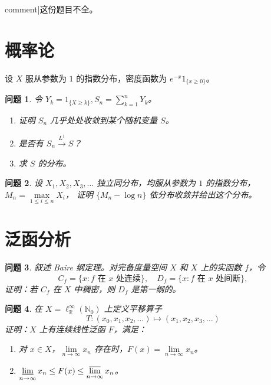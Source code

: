 \newtheorem{problem}{问题}

{{comment|这份题目不全。}}

\section{概率论}


设 \( X \) 服从参数为 $1$ 的指数分布，密度函数为 \( e^{-x}1_{\{x\geq 0\}} \)。

\begin{problem}
    令 \( Y_k = 1_{\{X \geq k\}}, S_n = \sum_{k=1}^n Y_k \)。
    \begin{enumerate}
        \item 证明 \( S_n \) 几乎处处收敛到某个随机变量 \( S \)。
        \item 是否有 \( S_n \overset{L^1}{\longrightarrow} S \)？
        \item 求 \( S \) 的分布。
    \end{enumerate}
\end{problem}
\begin{problem}
    设 \( X_1, X_2, X_3, \ldots \) 独立同分布，均服从参数为 $1$ 的指数分布，
    \( M_n = \max\limits_{1\leq i \leq n} X_i \)，
    证明 \(\{M_n - \log n\}\) 依分布收敛并给出这个分布。
\end{problem}

\section{泛函分析}

\begin{problem}
    叙述 Baire 纲定理。对完备度量空间 \( X \) 和 \( X \) 上的实函数 \( f \)，令  
    \[
    C_f = \{x : f \text{ 在 } x \text{ 处连续}\}, \quad D_f = \{x : f \text{ 在 } x \text{ 处间断}\},
    \]
    证明：若 \( C_f \) 在 \( X \) 中稠密，则 \( D_f \) 是第一纲的。
  \end{problem}
  \begin{problem} 
    在 \( X = \ell_{\mathbb{R}}^{\infty}(\mathbb{N}_0) \) 上定义平移算子  
    \[
    T : (x_0, x_1, x_2, \ldots) \mapsto (x_1, x_2, x_3, \ldots)
    \]
    证明：\( X \) 上有连续线性泛函 \( F \)，满足：
    \begin{enumerate}
        \item 对 \( x \in X \)，\(\lim\limits_{n \to \infty} x_n\) 存在时，\( F(x) = \lim\limits_{n \to \infty} x_n \)。
        \item \(\varliminf\limits_{n\to\infty} x_n \leq F(x) \leq \varlimsup\limits_{n\to\infty} x_n\)。
    \end{enumerate}
\end{problem}

